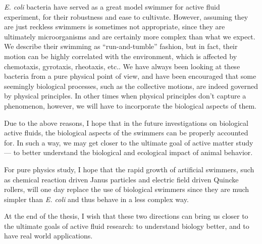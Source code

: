 \textit{E. coli} bacteria have served as a great model swimmer for active fluid experiment, for their robustness and ease to cultivate. However, assuming they are just reckless swimmers is sometimes not appropriate, since they are ultimately microorganisms and are certainly more complex than what we expect. We describe their swimming as ``run-and-tumble'' fashion, but in fact, their motion can be highly correlated with the environment, which is affected by chemotaxis, gyrotaxis, rheotaxis, etc.. We have always been looking at these bacteria from a pure physical point of view, and have been encouraged that some seemingly biological processes, such as the collective motions, are indeed governed by physical principles. In other times when physical principles don't capture a phenomenon, however, we will have to incorporate the biological aspects of them.

Due to the above reasons, I hope that in the future investigations on biological active fluids, the biological aspects of the swimmers can be properly accounted for. In such a way, we may get closer to the ultimate goal of active matter study --- to better understand the biological and ecological impact of animal behavior.

For pure physics study, I hope that the rapid growth of artificial swimmers, such as chemical reaction driven Janus particles and electric field driven Quincke rollers, will one day replace the use of biological swimmers since they are much simpler than \textit{E. coli} and thus behave in a less complex way.

At the end of the thesis, I wish that these two directions can bring us closer to the ultimate goals of active fluid research: to understand biology better, and to have real world applications.
